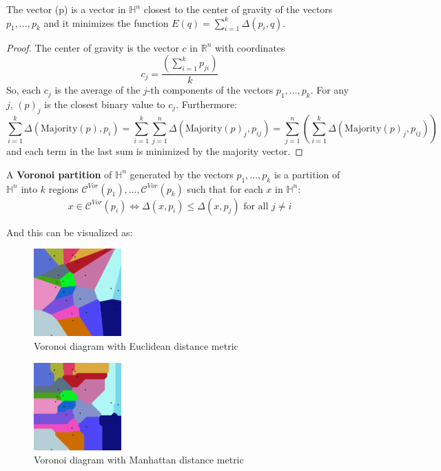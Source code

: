 \begin{lemma}
    The vector (p) is a vector in $\mathbb{H}^n$ closest to the center of gravity of the vectors $p_1, \dots, p_k$ and it minimizes the function $E(q) = \sum_{i=1}^k \Delta(p_i, q)$.
\end{lemma}
\begin{proof}
    The center of gravity is the vector $c$ in $\mathbb{R}^n$ with coordinates 
    \[
        c_j = \dfrac{\left(\sum\limits_{i=1}^{k} p_{ji}\right)}{k}
    \]
    So, each $c_j$ is the average of the $j$-th components of the vectors $p_1, \dots, p_k$.
    For any $j$, $(p)_j$ is the closest binary value to $c_j$. Furthermore:
    \[
        \sum_{i=1}^k \Delta(\text{Majority}(p), p_i) = \sum_{i=1}^k \sum_{j=1}^n \Delta(\text{Majority}(p)_j,p_{ij}) =   \sum_{j=1}^n \left(\sum_{i=1}^k \Delta(\text{Majority}(p)_j,p_{ij})\right)
    \]
    and each term in the last sum is minimized by the majority vector. 
\end{proof}

A \textbf{Voronoi partition} of $\mathbb{H}^n$ generated by the vectors $p_1, \dots, p_k$ is a partition of $\mathbb{H}^n$ into $k$ regions $\mathcal{C}^{Vor}(p_1), \dots, \mathcal{C}^{Vor}(p_k)$ such that for each $x$ in $\mathbb{H}^n$:
\[
    x \in \mathcal{C}^{Vor}(p_i) \iff \Delta(x, p_i) \leq \Delta(x, p_j) \text{ for all } j \neq i    
\]

And this can be visualized as: 
    \begin{multicols}{2}
        \begin{center}
            \begin{figure}[H]
                \centering
                \includegraphics[width=0.3\textwidth]{./Images/Euclidean_Voronoi_diagram.png}
                \caption{Voronoi diagram with Euclidean distance metric}
            \end{figure}
        \end{center}
        \begin{center}
            \begin{figure}[H]
                \centering
                \includegraphics[width=0.3\textwidth]{./Images/Manhattan_Voronoi_Diagram.png}
                \caption{Voronoi diagram with Manhattan distance metric}
            \end{figure}
        \end{center}
    \end{multicols}

